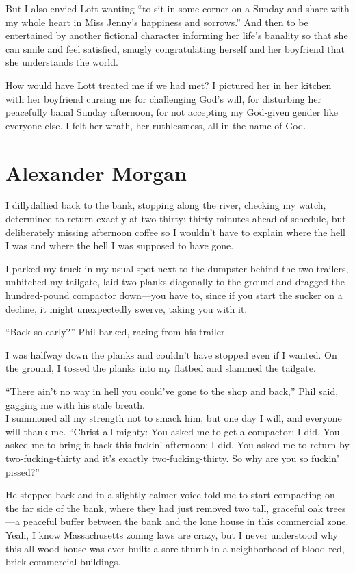 But I also envied Lott wanting ``to sit in some corner on a Sunday and
share with my whole heart in Miss Jenny's happiness and sorrows.'' And
then to be entertained by another fictional character informing her
life's banality so that she can smile and feel satisfied, smugly
congratulating herself and her boyfriend that she understands the world.

How would have Lott treated me if we had met? I pictured her in her
kitchen with her boyfriend cursing me for challenging God's will, for
disturbing her peacefully banal Sunday afternoon, for not accepting my
God-given gender like everyone else. I felt her wrath, her ruthlessness,
all in the name of God.

\chapter{Alexander Morgan}

\titlemark

I dillydallied back to the bank, stopping along the river, checking my
watch, determined to return exactly at two-thirty: thirty minutes ahead
of schedule, but deliberately missing afternoon coffee so I wouldn't
have to explain where the hell I was and where the hell I was supposed
to have gone.

I parked my truck in my usual spot next to the dumpster behind the two
trailers, unhitched my tailgate, laid two planks diagonally to the
ground and dragged the hundred-pound compactor down---you have to, since
if you start the sucker on a decline, it might unexpectedly swerve,
taking you with it.

``Back so early?'' Phil barked, racing from his trailer.

I was halfway down the planks and couldn't have stopped even if I
wanted. On the ground, I tossed the planks into my flatbed and slammed
the tailgate.

``There ain't no way in hell you could've gone to the shop and back,''
Phil said, gagging me with his stale breath.\\

I summoned all my strength not to smack him, but one day I will, and
everyone will thank me. ``Christ all-mighty: You asked me to get a
compactor; I did. You asked me to bring it back this fuckin' afternoon;
I did. You asked me to return by two-fucking-thirty and it's exactly
two-fucking-thirty. So why are you so fuckin' pissed?''

He stepped back and in a slightly calmer voice told me to start
compacting on the far side of the bank, where they had just removed two
tall, graceful oak trees---a peaceful buffer between the bank and the
lone house in this commercial zone. Yeah, I know Massachusetts zoning
laws are crazy, but I never understood why this all-wood house was ever
built: a sore thumb in a neighborhood of blood-red, brick commercial
buildings.

